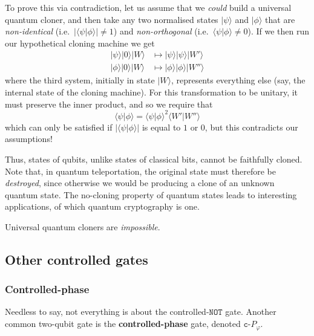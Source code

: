 \documentclass[fleqn,a4paper]{article}
\newenvironment{idea}{\everypar{\setlength{\parindent}{1.5em}}}{}
\theoremstyle{definition}
\theoremstyle{definition}
\theoremstyle{definition}
\theoremstyle{definition}
\theoremstyle{remark}
\begin{document}
To prove this via contradiction, let us assume that we \emph{could} build a universal quantum cloner, and then take any two normalised states \(|\psi\rangle\) and \(|\phi\rangle\) that are \emph{non-identical} (i.e.~\(|\langle\psi|\phi\rangle|\neq1\)) and \emph{non-orthogonal} (i.e.~\(\langle\psi|\phi\rangle\neq0\)).
If we then run our hypothetical cloning machine we get
\[
  \begin{aligned}
    |\psi\rangle|0\rangle|W\rangle
    &\mapsto |\psi\rangle|\psi\rangle|W'\rangle
  \\|\phi\rangle|0\rangle|W\rangle
    &\mapsto |\phi\rangle|\phi\rangle|W''\rangle
  \end{aligned}
\]
where the third system, initially in state \(|W\rangle\), represents everything else (say, the internal state of the cloning machine).
For this transformation to be unitary, it must preserve the inner product, and so we require that
\[
  \langle\psi|\phi\rangle
  = \langle\psi|\phi\rangle^2 \langle W'|W''\rangle
\]
which can only be satisfied if \(|\langle\psi|\phi\rangle|\) is equal to \(1\) or \(0\), but this contradicts our assumptions!

Thus, states of qubits, unlike states of classical bits, cannot be faithfully cloned.
Note that, in quantum teleportation, the original state must therefore be \emph{destroyed}, since otherwise we would be producing a clone of an unknown quantum state.
The no-cloning property of quantum states leads to interesting applications, of which quantum cryptography is one.

\begin{idea}
Universal quantum cloners are \emph{impossible}.

\end{idea}

\hypertarget{other-controlled-gates}{%
\subsection{Other controlled gates}\label{other-controlled-gates}}

\hypertarget{controlled-phase}{%
\subsubsection{Controlled-phase}\label{controlled-phase}}

Needless to say, not everything is about the controlled-\(\texttt{NOT}\) gate.
Another common two-qubit gate is the \textbf{controlled-phase} gate, denoted \(\texttt{c-}P_\varphi\).
\end{document}
